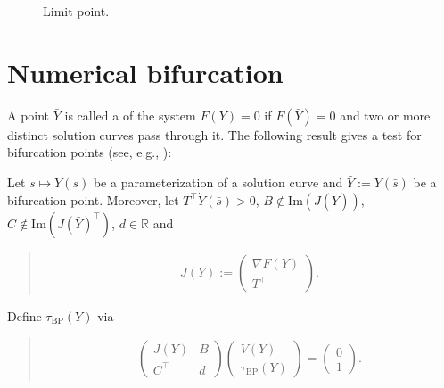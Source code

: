 \documentclass[a4paper,11pt,english]{sphinxmanual}
\begin{document}
\begin{figure}[htbp]
\centering
\capstart

\noindent{}
\caption{Limit point.}\label{\detokenize{userdoc/model_continuation:id12}}\label{\detokenize{userdoc/model_continuation:ud-fig-limitpoint}}\end{figure}


\section{Numerical bifurcation}
\label{\detokenize{userdoc/model_continuation:numerical-bifurcation}}
A point \(\bar{Y}\) is called a  of the system
\(F(Y) = 0\) if \(F(\bar{Y}) = 0\) and two or more distinct solution
curves pass through it. The following result gives a test for 
bifurcation points (see, e.g., ):

Let \(s \mapsto Y(s)\) be a parameterization of a solution curve and
\(\bar{Y} := Y(\bar{s})\) be a bifurcation point. Moreover, let
\(T^{\top} \dot{Y}(\bar{s}) > 0\),
\(B \notin \mathrm{Im}(J(\bar{Y}))\),
\(C \notin \mathrm{Im}(J(\bar{Y})^{\top})\), \(d \in \mathbb{R}\) and
\begin{quote}
\begin{equation*}
\begin{split}J(Y) := \begin{pmatrix}\nabla F(Y)\\ T^{\top}\end{pmatrix}.\end{split}
\end{equation*}\end{quote}

Define \(\tau_{\mathrm{BP}}(Y)\) via
\begin{quote}
\begin{equation*}
\begin{split}\begin{pmatrix}J(Y)& B\\ C^{\top}& d\end{pmatrix} \begin{pmatrix}V(Y)\\ \tau_{\mathrm{BP}}(Y)\end{pmatrix} = \begin{pmatrix}0\\ 1\end{pmatrix}.\end{split}
\end{equation*}\end{quote}
\end{document}
